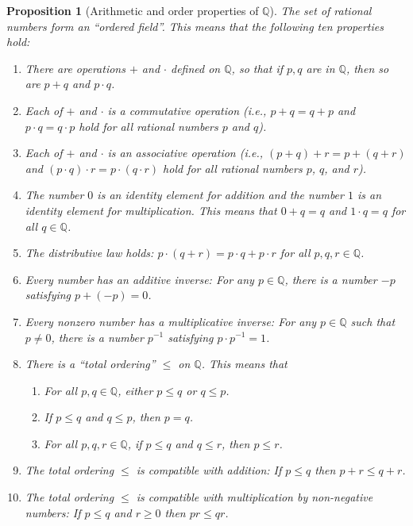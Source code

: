 \documentclass[12pt]{amsart}
\newcommand{\Q}{\mathbb{Q}}
\numberwithin{equation}{section}
\theoremstyle{plain} %
\newtheorem{prop}[equation]{Proposition}
\theoremstyle{definition}
\theoremstyle{remark}
\begin{document}
\begin{prop}[Arithmetic and order properties of $\Q$]\label{prop1}
  The set of rational numbers form an ``ordered field''.\label{ordered field} This means that the following ten properties hold:
\begin{enumerate}
\item There are operations $+$ and $\cdot$ defined on $\Q$, so that if $p, q$ are in $\Q$, then so are $p + q$ and $p \cdot q$.
\item Each of $+$ and $\cdot$ is a commutative operation (i.e., $p + q = q + p$ and $p \cdot q = q \cdot p$ hold for all rational numbers $p$ and $q$). 
\item Each of $+$ and $\cdot$ is an associative  operation (i.e., $(p + q) + r = p + (q + r)$ and $(p \cdot q) \cdot r = p \cdot (q \cdot r)$ hold for all rational numbers $p$,
  $q$, and $r$). 
\item The number $0$ is an identity element for addition and the number $1$ is an identity element for multiplication. This means that
 $0 + q = q$ and $1 \cdot q = q$ for all $q \in \Q$. 
\item The distributive law holds: $p \cdot (q + r) = p \cdot q + p \cdot r$ for all $p,q,r \in \Q$. 
\item Every number has an additive inverse: For any $p \in \Q$, there is a number $-p$ satisfying $p + (-p) = 0$.
\item Every nonzero number has a multiplicative inverse: For any $p \in \Q$ such that $p \ne 0$, there is a number $p^{-1}$ satisfying ${p \cdot p^{-1}= 1}$.
\item There is a ``total ordering'' $\leq$ on $\Q$. This means that 
\begin{enumerate}
\item For all $p, q \in \Q$, either $p \leq q$ or $q \leq p$.
\item If $p \leq q$ and $q \leq p$, then $p = q$.
\item For all $p, q, r \in \Q$, if $p \leq q$ and $q \leq r$, then $p \leq r$.
\end{enumerate}
\item The total ordering $\leq$ is compatible with addition: If $p \leq q$ then $p + r \leq q + r$.
\item The total ordering $\leq$ is compatible with multiplication by non-negative numbers: 
If $p \leq q$ and $r \geq 0$ then $pr \leq qr$.
\end{enumerate}
\end{prop}
\end{document}
